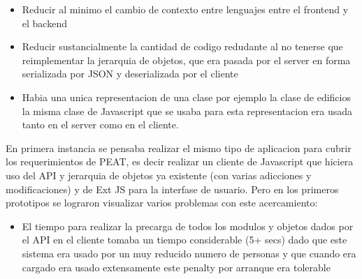 \documentclass{article}
\begin{document}
\begin{itemize}
\item Reducir al minimo el cambio de contexto entre lenguajes entre
  el frontend y el backend
\item Reducir sustancialmente la cantidad de codigo redudante al no
  tenerse que reimplementar la jerarquia de objetos, que era pasada
  por el server en forma serializada por JSON y deserializada por el
  cliente
\item Habia una unica representacion de una clase por ejemplo la
  clase de edificios la misma clase de Javascript que se usaba para
  esta representacion era usada tanto en el server como en el
  cliente.
\end{itemize}

En primera instancia se pensaba realizar el mismo tipo de aplicacion
para cubrir los requerimientos de PEAT, es decir realizar un cliente
de Javascript que hiciera uso del API y jerarquia de objetos ya
existente (con varias adicciones y modificaciones) y de Ext JS
para la interfase de usuario. Pero en los primeros prototipos se
lograron visualizar varios problemas con este acercamiento:
\begin{itemize}
\item El tiempo para realizar la precarga de todos los modulos y
  objetos dados por el API en el cliente tomaba un tiempo
  considerable (5+ secs) dado que este sistema era usado por un muy
  reducido numero de personas y que cuando era cargado era usado
  extensamente este penalty por arranque era tolerable
\end{itemize}
\end{document}
